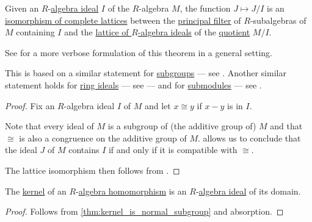 \begin{theorem}\label{thm:lattice_theorem_for_algebra_ideals}
  Given an \( R \)-\hyperref[def:algebra_over_ring/ideal]{algebra ideal} \( I \) of the \( R \)-algebra \( M \), the function \( J \mapsto J / I \) is an \hyperref[def:lattice/morphism]{isomorphism of complete lattices} between the \hyperref[def:lattice_ideal/principal]{principal filter} of \( R \)-subalgebras of \( M \) containing \( I \) and the \hyperref[thm:semiring_of_ideals/lattice]{lattice of \( R \)-algebra ideals} of the \hyperref[def:algebra_over_ring/quotient]{quotient} \( M / I \).
\end{theorem}
\begin{comments}
  \item See  for a more verbose formulation of this theorem in a general setting.

  \item This is based on a similar statement for \hyperref[def:group/subobject]{subgroups} --- see . Another similar statement holds for \hyperref[def:ring/ideal]{ring ideals} --- see  --- and for \hyperref[def:module]{submodules} --- see .
\end{comments}
\begin{proof}
  Fix an \( R \)-algebra ideal \( I \) of \( M \) and let \( x \cong y \) if \( x - y \) is in \( I \).

  Note that every ideal of \( M \) is a subgroup of (the additive group of) \( M \) and that \( {\cong} \) is also a congruence on the additive group of \( M \).  allows us to conclude that the ideal \( J \) of \( M \) contains \( I \) if and only if it is compatible with \( {\cong} \).

  The lattice isomorphism then follows from .
\end{proof}

\begin{proposition}\label{thm:kernel_is_algebra_ideal}
  The \hyperref[def:algebra_over_ring/kernel]{kernel} of an \( R \)-\hyperref[def:algebra_over_ring/morphism]{algebra homomorphism} is an \( R \)-\hyperref[def:algebra_over_ring/ideal]{algebra ideal} of its domain.
\end{proposition}
\begin{proof}
  Follows from \cref{thm:kernel_is_normal_subgroup} and absorption.
\end{proof}

